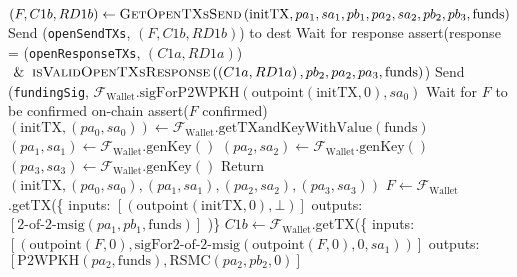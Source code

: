 \begin{algorithmic}[1]
      \EndIndent
      \State $\left(F, C1b, RD1b\right) \gets
      \textsc{GetOpenTXsSend}\left(\mathrm{initTX}, pa_1, sa_1, pb_1, pa_2, sa_2,
      pb_2, pb_3, \mathrm{funds}\right)$
      \State Send (\texttt{openSendTXs}, $\left(F, C1b, RD1b\right)$) to dest
      \State Wait for response
      \State assert(response = (\texttt{openResponseTXs}, $\left(C1a, RD1a\right)$)
      \Indent
        \State $\And \textsc{isValidOpenTXsResponse}\left(\left(C1a, RD1a\right), pb_2,
        pa_2, pa_3, \mathrm{funds}\right)$)
      \EndIndent
      \State Send (\texttt{fundingSig}, $\mathcal{F}_{\mathrm{Wallet}}.\text{sigForP2WPKH}
      \left(\mathrm{outpoint}\left(\mathrm{initTX}, 0\right), sa_0\right)$
      \State Wait for $F$ to be confirmed on-chain
      \State assert($F$ confirmed) 
    \EndProcedure
    \State
      \State $\left(\mathrm{initTX}, \left(pa_0, sa_0\right)\right) \gets
      \mathcal{F}_{\mathrm{Wallet}}.\mathrm{getTXandKeyWithValue}
      \left(\mathrm{funds}\right)$ 
      \State $\left(pa_1, sa_1\right) \leftarrow
      \mathcal{F}_{\mathrm{Wallet}}.\mathrm{genKey}\left(\right)$ 
      \State $\left(pa_2, sa_2\right) \leftarrow
      \mathcal{F}_{\mathrm{Wallet}}.\mathrm{genKey}\left(\right)$ 
      \State $\left(pa_3, sa_3\right) \leftarrow
      \mathcal{F}_{\mathrm{Wallet}}.\mathrm{genKey}\left(\right)$ 
      \State Return $\left(\mathrm{initTX}, \left(pa_0, sa_0\right), \left(pa_1,
      sa_1\right), \left(pa_2, sa_2\right), \left(pa_3, sa_3\right)\right)$
    \EndProcedure
    \State
      \State $F \gets \mathcal{F}_{\mathrm{Wallet}}$.getTX(\{
      \State inputs: $\left[\left(\mathrm{outpoint}\left(\mathrm{initTX}, 0\right),
      \bot\right)\right]$
      \State outputs: $\left[\text{2-of-2-msig}\left(pa_1, pb_1,
      \mathrm{funds}\right)\right]$
      \State )\}
      \State $C1b \gets \mathcal{F}_{\mathrm{Wallet}}$.getTX(\{
      \State inputs: $\left[\left(\mathrm{outpoint}\left(F, 0\right),
      \text{sigFor2-of-2-msig}\left(\mathrm{outpoint}\left(F, 0\right), 0,
      sa_1\right)\right)\right]$
      \State outputs: $\left[\mathrm{P2WPKH}\left(pa_2, \mathrm{funds}\right),
      \mathrm{RSMC}\left(pa_2, pb_2, 0\right)\right]$

\end{algorithmic}
